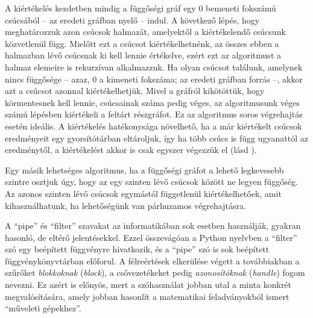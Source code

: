 A kiértékelés kezdetben mindig a függőségi gráf egy 0 bemeneti fokszámú csúcsából -- az eredeti gráfban nyelő -- indul.
A következő lépés, hogy meghatározzuk azon csúcsok halmazát, amelyektől a kiértékelendő csúcsunk közvetlenül függ.
Mielőtt ezt a csúcsot kiértékelhetnénk, az összes ebben a halmazban lévő csúcsnak ki kell lennie értékelve, ezért ezt az algoritmust a halmaz elemeire is rekurzívan alkalmazzuk.
Ha olyan csúcsot találunk, amelynek nincs függősége -- azaz, 0 a kimeneti fokszáma; az eredeti gráfban forrás --, akkor azt a csúcsot azonnal kiértékelhetjük.
Mivel a gráfról kikötöttük, hogy körmentesnek kell lennie, csúcsainak száma pedig véges, az algoritmusunk véges számú lépésben kiértékeli a feltárt részgráfot.
Ez az algoritmus soros végrehajtás esetén ideális.
A kiértékelés hatékonysága növelhető, ha a már kiértékelt csúcsok eredményeit egy gyorsítótárban eltároljuk, így ha több csúcs is függ ugyanattól az eredménytől, a kiértékelést akkor is csak egyszer végezzük el (lásd \cite{wiki:Memoization}).

Egy másik lehetséges algoritmus, ha a függőségi gráfot a lehető legkevesebb szintre osztjuk úgy, hogy az egy szinten lévő csúcsok között ne legyen függőség.
Az azonos szinten lévő csúcsok egymástól függetlenül kiértékelhetőek, amit kihasználhatunk, ha lehetőségünk van párhuzamos végrehajtásra.

A ``pipe'' és ``filter'' szavakat az informatikában sok esetben használják, gyakran hasonló, de eltérő jelentésekkel.
Ezzel összevágóan a Python nyelvben a ``filter'' szó egy beépített függvényre hivatkozik, és a ``pipe'' szó is sok beépített függvénykönyvtárban előforul.
A félreértések elkerülése végett a továbbiakban a szűrőket \textit{blokkoknak} (\textit{block}), a csővezetékeket pedig \textit{azonosítóknak} (\textit{handle}) fogom nevezni.
Ez azért is előnyös, mert a szóhasználat jobban utal a minta konkrét megvalósítására, amely jobban hasonlít a matematikai feladványokból ismert ``műveleti gépekhez''.

